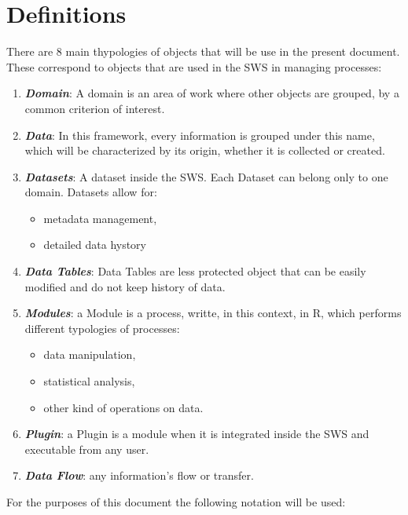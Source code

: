 \documentclass[]{article}
\providecommand{\tightlist}{%
  \setlength{\itemsep}{0pt}\setlength{\parskip}{0pt}}
\begin{document}
\section*{Definitions}\label{definitions}

There are 8 main thypologies of objects that will be use in the present
document. These correspond to objects that are used in the SWS in
managing processes:

\begin{enumerate}
\def\labelenumi{\arabic{enumi}.}
\tightlist
\item
  \textbf{\emph{Domain}}: A domain is an area of work where other
  objects are grouped, by a common criterion of interest.
\item
  \textbf{\emph{Data}}: In this framework, every information is grouped
  under this name, which will be characterized by its origin, whether it
  is collected or created.
\item
  \textbf{\emph{Datasets}}: A dataset inside the SWS. Each Dataset can
  belong only to one domain. Datasets allow for:

  \begin{itemize}
  \tightlist
  \item
    metadata management,
  \item
    detailed data hystory
  \end{itemize}
\item
  \textbf{\emph{Data Tables}}: Data Tables are less protected object
  that can be easily modified and do not keep history of data.
\item
  \textbf{\emph{Modules}}: a Module is a process, writte, in this
  context, in R, which performs different typologies of processes:

  \begin{itemize}
  \tightlist
  \item
    data manipulation,
  \item
    statistical analysis,
  \item
    other kind of operations on data.
  \end{itemize}
\item
  \textbf{\emph{Plugin}}: a Plugin is a module when it is integrated
  inside the SWS and executable from any user.
\item
  \textbf{\emph{Data Flow}}: any information's flow or transfer.
\end{enumerate}

For the purposes of this document the following notation will be used:
\end{document}
